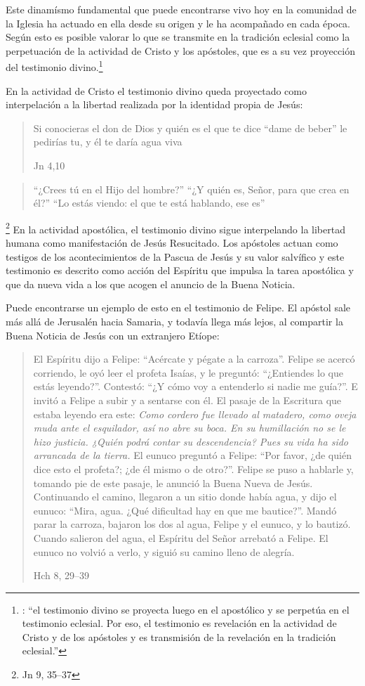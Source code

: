 Este dinamísmo fundamental que puede encontrarse vivo hoy en la comunidad de la
Iglesia ha actuado en ella desde su origen y le ha acompañado en cada época.
Según esto es posible valorar lo que se transmite en la tradición eclesial como
la perpetuación de la actividad de Cristo y los apóstoles, que es a su vez
proyección del testimonio divino.\footnote{\cite[Cf.~][573]{ninot2009tf}:
  \enquote{el testimonio divino se proyecta luego en el apostólico y se perpetúa
    en el testimonio eclesial. Por eso, el testimonio es revelación en la
    actividad de Cristo y de los apóstoles y es transmisión de la revelación en
    la tradición eclesial.}}

En la actividad de Cristo el testimonio divino queda proyectado como
interpelación a la libertad realizada por la identidad propia de Jesús:
\blockquote[Jn 4,10]{Si conocieras el don de Dios y quién es el que te dice
  \enquote{dame de beber} le pedirías tu, y él te daría agua viva};
\blockquote{\enquote{¿Crees tú en el Hijo del hombre?}\textelp{} \enquote{¿Y
    quién es, Señor, para que crea en él?}\textelp{} \enquote{Lo estás viendo:
    el que te está hablando, ese es}}.\footnote{Jn 9, 35--37} En la actividad
apostólica, el testimonio divino sigue interpelando la libertad humana como
manifestación de Jesús Resucitado. Los apóstoles actuan como testigos de los
acontecimientos de la Pascua de Jesús y su valor
salvífico\autocite[Cf.][576]{ninot2009tf} y este testimonio es descrito como
acción del Espíritu que impulsa la tarea apostólica y que da nueva vida a los
que acogen el anuncio de la Buena Noticia.

Puede encontrarse un ejemplo de esto en el testimonio de Felipe. El apóstol sale
más allá de Jerusalén hacia Samaria, y todavía llega más lejos, al compartir la
Buena Noticia de Jesús con un extranjero Etíope:

\blockquote[Hch 8, 29--39]{El Espíritu dijo a Felipe: \enquote{Acércate y pégate
    a la carroza}. Felipe se acercó corriendo, le oyó leer el profeta Isaías, y
  le preguntó: \enquote{¿Entiendes lo que estás leyendo?}. Contestó: \enquote{¿Y
    cómo voy a entenderlo si nadie me guía?}. E invitó a Felipe a subir y a
  sentarse con él. El pasaje de la Escritura que estaba leyendo era este:
  \emph{Como cordero fue llevado al matadero, como oveja muda ante el
    esquilador, así no abre su boca. En su humillación no se le hizo justicia.
    ¿Quién podrá contar su descendencia? Pues su vida ha sido arrancada de la
    tierra.} El eunuco preguntó a Felipe: \enquote{Por favor, ¿de quién dice
    esto el profeta?; ¿de él mismo o de otro?}. Felipe se puso a hablarle y,
  tomando pie de este pasaje, le anunció la Buena Nueva de Jesús. Continuando el
  camino, llegaron a un sitio donde había agua, y dijo el eunuco: \enquote{Mira,
    agua. ¿Qué dificultad hay en que me bautice?}. Mandó parar la carroza,
  bajaron los dos al agua, Felipe y el eunuco, y lo bautizó. Cuando salieron del
  agua, el Espíritu del Señor arrebató a Felipe. El eunuco no volvió a verlo, y
  siguió su camino lleno de alegría.}

